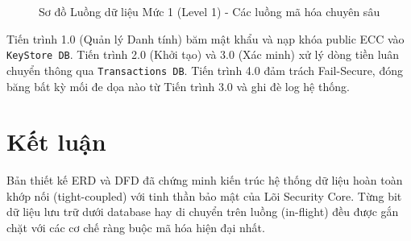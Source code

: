 \documentclass[11pt,a4paper]{article}
\begin{document}
\begin{figure}[H]
{
    }
    \caption{Sơ đồ Luồng dữ liệu Mức 1 (Level 1) - Các luồng mã hóa chuyên sâu}
\end{figure}

Tiến trình 1.0 (Quản lý Danh tính) băm mật khẩu và nạp khóa public ECC vào \texttt{KeyStore DB}. Tiến trình 2.0 (Khởi tạo) và 3.0 (Xác minh) xử lý dòng tiền luân chuyển thông qua \texttt{Transactions DB}. Tiến trình 4.0 đảm trách Fail-Secure, đóng băng bất kỳ mối đe dọa nào từ Tiến trình 3.0 và ghi đè log hệ thống.

\section{Kết luận}
Bản thiết kế ERD và DFD đã chứng minh kiến trúc hệ thống dữ liệu hoàn toàn khớp nối (tight-coupled) với tinh thần bảo mật của Lõi Security Core. Từng bit dữ liệu lưu trữ dưới database hay di chuyển trên luồng (in-flight) đều được gắn chặt với các cơ chế ràng buộc mã hóa hiện đại nhất.
\end{document}
